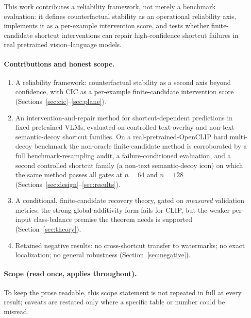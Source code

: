 \documentclass[11pt]{article}
\begin{document}
This work contributes a reliability framework, not merely a benchmark evaluation: it
defines counterfactual stability as an operational reliability axis, implements it as
a per-example intervention score, and tests whether finite-candidate shortcut
interventions can repair high-confidence shortcut failures in real pretrained
vision--language models.

\paragraph{Contributions and honest scope.}
\begin{enumerate}[leftmargin=1.4em,itemsep=2pt]
\item A reliability framework: counterfactual stability as a second axis beyond
confidence, with CIC as a per-example finite-candidate intervention score
(Sections~\ref{sec:cic}--\ref{sec:plane}).
\item An intervention-and-repair method for shortcut-dependent predictions in fixed
pretrained VLMs, evaluated on controlled text-overlay and non-text semantic-decoy
shortcut families. On a real-pretrained-OpenCLIP hard multi-decoy benchmark the
non-oracle finite-candidate method is corroborated by a full benchmark-resampling
audit, a failure-conditioned evaluation, and a second controlled shortcut family
(a non-text semantic-decoy icon) on which the same method passes all gates at $n=64$
and $n=128$ (Sections~\ref{sec:design}--\ref{sec:results}).
\item A conditional, finite-candidate recovery theory, gated on \emph{measured}
validation metrics: the strong global-additivity form fails for CLIP, but the
weaker per-input class-balance premise the theorem needs is supported
(Section~\ref{sec:theory}).
\item Retained negative results: no cross-shortcut transfer to watermarks; no exact
localization; no general robustness (Section~\ref{sec:negative}).
\end{enumerate}
\paragraph{Scope (read once, applies throughout).}
\begin{center}
\end{center}
\noindent To keep the prose readable, this scope statement is not repeated in full at
every result; caveats are restated only where a specific table or number could be
misread.
\end{document}
